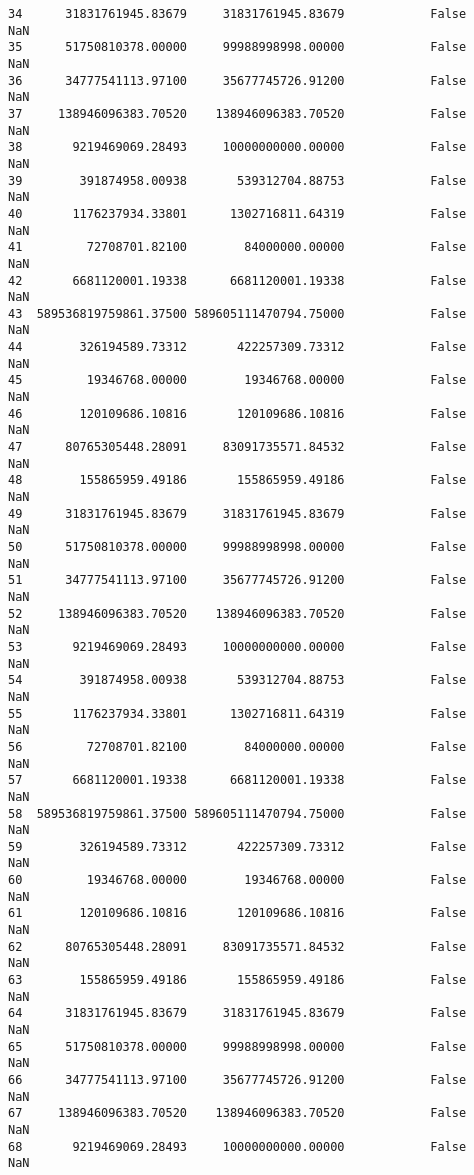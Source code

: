 \documentclass[11pt]{article}
\begin{document}
\begin{tcolorbox}[breakable, size=fbox, boxrule=.5pt, pad at break*=1mm, opacityfill=0]
\begin{Verbatim}[commandchars=\\\{\}]
34      31831761945.83679     31831761945.83679            False       NaN
35      51750810378.00000     99988998998.00000            False       NaN
36      34777541113.97100     35677745726.91200            False       NaN
37     138946096383.70520    138946096383.70520            False       NaN
38       9219469069.28493     10000000000.00000            False       NaN
39        391874958.00938       539312704.88753            False       NaN
40       1176237934.33801      1302716811.64319            False       NaN
41         72708701.82100        84000000.00000            False       NaN
42       6681120001.19338      6681120001.19338            False       NaN
43  589536819759861.37500 589605111470794.75000            False       NaN
44        326194589.73312       422257309.73312            False       NaN
45         19346768.00000        19346768.00000            False       NaN
46        120109686.10816       120109686.10816            False       NaN
47      80765305448.28091     83091735571.84532            False       NaN
48        155865959.49186       155865959.49186            False       NaN
49      31831761945.83679     31831761945.83679            False       NaN
50      51750810378.00000     99988998998.00000            False       NaN
51      34777541113.97100     35677745726.91200            False       NaN
52     138946096383.70520    138946096383.70520            False       NaN
53       9219469069.28493     10000000000.00000            False       NaN
54        391874958.00938       539312704.88753            False       NaN
55       1176237934.33801      1302716811.64319            False       NaN
56         72708701.82100        84000000.00000            False       NaN
57       6681120001.19338      6681120001.19338            False       NaN
58  589536819759861.37500 589605111470794.75000            False       NaN
59        326194589.73312       422257309.73312            False       NaN
60         19346768.00000        19346768.00000            False       NaN
61        120109686.10816       120109686.10816            False       NaN
62      80765305448.28091     83091735571.84532            False       NaN
63        155865959.49186       155865959.49186            False       NaN
64      31831761945.83679     31831761945.83679            False       NaN
65      51750810378.00000     99988998998.00000            False       NaN
66      34777541113.97100     35677745726.91200            False       NaN
67     138946096383.70520    138946096383.70520            False       NaN
68       9219469069.28493     10000000000.00000            False       NaN

\end{Verbatim}
\end{tcolorbox}
\end{document}
